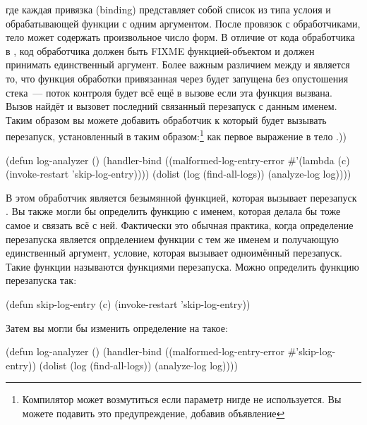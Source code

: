 \noindent{}где каждая привязка (binding) представляет собой список из типа услоия и обрабатывающей
функции с одним аргументом. После провязок с обработчиками, тело  может
содержать произвольное число форм. В отличие от кода обработчика в ,
код обработчика должен быть FIXME функцией-объектом и должен принимать единственный
аргумент. Более важным различием между  и  является
то, что функция обработки привязанная через  будет запущена без
опустошения стека~--- поток контроля будет всё ещё в вызове  если
эта функция вызвана. Вызов  найдёт и вызовет последний связанный
перезапуск с данным именем. Таким образом вы можете добавить обработчик к
 который будет вызывать  перезапуск, установленный
в  таким образом:\footnote{Компилятор может возмутиться если параметр
    нигде не используется. Вы можете подавить это предупреждение, добавив объявление
    } как первое выражение в тело .))

\begin{myverb}
(defun log-analyzer ()
  (handler-bind ((malformed-log-entry-error
                  #'(lambda (c)
                      (invoke-restart 'skip-log-entry))))
    (dolist (log (find-all-logs))
      (analyze-log log))))
\end{myverb}

В этом  обработчик является безымянной функцией, которая вызывает
перезапуск . Вы также могли бы определить функцию с именем, которая
делала бы тоже самое и связать всё с ней. Фактически это обычная практика, когда
определение перезапуска является опрделением функции с тем же именем и получающую
единственный аргумент, условие, которая вызывает одноимённый перезапуск. Такие функции
называются функциями перезапуска. Можно определить функцию перезапуска
 так:

\begin{myverb}
(defun skip-log-entry (c)
  (invoke-restart 'skip-log-entry))
\end{myverb}

Затем вы могли бы изменить определение  на такое:

\begin{myverb}
(defun log-analyzer ()
  (handler-bind ((malformed-log-entry-error #'skip-log-entry))
    (dolist (log (find-all-logs))
      (analyze-log log))))
\end{myverb}

